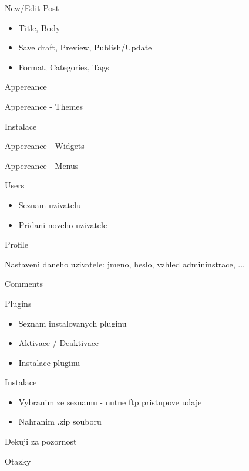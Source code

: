 \documentclass{beamer}
\begin{document}
\begin{frame}
    {New/Edit Post}

    \begin{itemize}
        \item Title, Body
        \item Save draft, Preview, Publish/Update
        \item Format, Categories, Tags
    \end{itemize}
\end{frame}


\begin{frame}
    {Appereance}
\end{frame}


\begin{frame}
    {Appereance - Themes}
\end{frame}


\begin{frame}
    {Instalace}
\end{frame}


\begin{frame}
    {Appereance - Widgets}
\end{frame}


\begin{frame}
    {Appereance - Menus}
\end{frame}


\begin{frame}
    {Users}

    \begin{itemize}
        \item Seznam uzivatelu
        \item Pridani noveho uzivatele
    \end{itemize}
\end{frame}


\begin{frame}
    {Profile}

    Nastaveni daneho uzivatele: jmeno, heslo, vzhled admininstrace, ...
\end{frame}


\begin{frame}
    {Comments}
\end{frame}


\begin{frame}
    {Plugins}

    \begin{itemize}
        \item Seznam instalovanych pluginu
        \item Aktivace / Deaktivace
        \item Instalace pluginu
    \end{itemize}
\end{frame}


\begin{frame}
    {Instalace}

    \begin{itemize}
        \item Vybranim ze seznamu - nutne ftp pristupove udaje
        \item Nahranim .zip souboru
    \end{itemize}
\end{frame}


\begin{frame}
    {Dekuji za pozornost}
\end{frame}


\begin{frame}
    {Otazky}
\end{frame}
\end{document}
